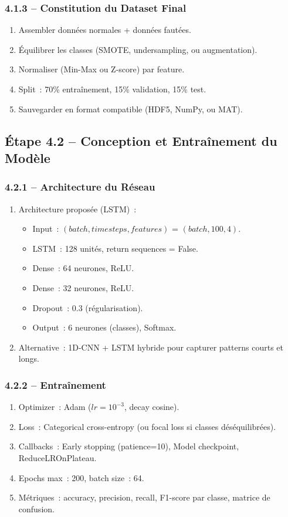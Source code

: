 \documentclass[a4paper,12pt]{article}
\begin{document}
\subsubsection{4.1.3 -- Constitution du Dataset Final}
\begin{enumerate}[nosep]
  \item Assembler données normales + données fautées.
  \item Équilibrer les classes (SMOTE, undersampling, ou augmentation).
  \item Normaliser (Min-Max ou Z-score) par feature.
  \item Split~: 70\% entraînement, 15\% validation, 15\% test.
  \item Sauvegarder en format compatible (HDF5, NumPy, ou MAT).
\end{enumerate}

\subsection{Étape 4.2 -- Conception et Entraînement du Modèle}

\subsubsection{4.2.1 -- Architecture du Réseau}
\begin{enumerate}[nosep]
  \item Architecture proposée (LSTM)~:
    \begin{itemize}[nosep]
      \item Input~: $(batch, timesteps, features)$ = $(batch, 100, 4)$.
      \item LSTM~: 128 unités, return sequences = False.
      \item Dense~: 64 neurones, ReLU.
      \item Dense~: 32 neurones, ReLU.
      \item Dropout~: 0.3 (régularisation).
      \item Output~: 6 neurones (classes), Softmax.
    \end{itemize}
  \item Alternative~: 1D-CNN + LSTM hybride pour capturer patterns courts et longs.
\end{enumerate}

\subsubsection{4.2.2 -- Entraînement}
\begin{enumerate}[nosep]
  \item Optimizer~: Adam ($lr = 10^{-3}$, decay cosine).
  \item Loss~: Categorical cross-entropy (ou focal loss si classes déséquilibrées).
  \item Callbacks~: Early stopping (patience=10), Model checkpoint, ReduceLROnPlateau.
  \item Epochs max~: 200, batch size~: 64.
  \item Métriques~: accuracy, precision, recall, F1-score par classe, matrice de confusion.
\end{enumerate}
\end{document}
